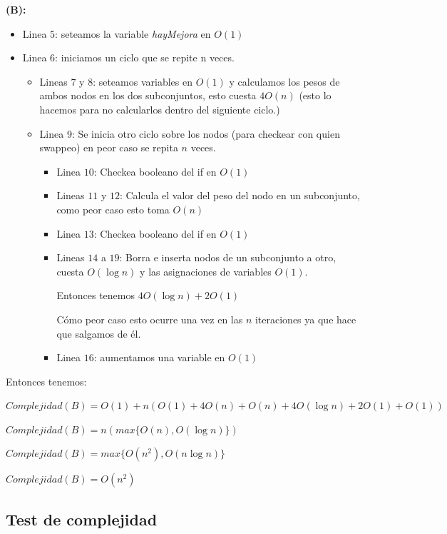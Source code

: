 \textbf{(B):}

\begin{itemize}
    \item Linea $5$: seteamos la variable \textit{hayMejora} en $O(1)$
    \item Linea $6$: iniciamos un ciclo que se repite n veces.
    \begin{itemize}
        \item Lineas $7$ y $8$: seteamos variables en $O(1)$ y calculamos los pesos de ambos nodos en los dos subconjuntos, esto cuesta $4O(n)$ (esto lo hacemos para no calcularlos dentro del siguiente ciclo.)
        \item Linea $9$: Se inicia otro ciclo sobre los nodos (para checkear con quien swappeo) en peor caso se repita $n$ veces.
        \begin{itemize}
            \item Linea $10$: Checkea booleano del if en $O(1)$
            \item Lineas $11$ y $12$: Calcula el valor del peso del nodo en un subconjunto, como peor caso esto toma $O(n)$
            \item Linea $13$: Checkea booleano del if en $O(1)$
            \item Lineas $14$ a $19$: Borra e inserta nodos de un subconjunto a otro, cuesta $O(\log n)$ y las asignaciones de variables $O(1)$. 

            Entonces tenemos $4O(\log n) + 2O(1)$

            Cómo peor caso esto ocurre una vez en las $n$ iteraciones ya que hace que salgamos de él.
            \item Linea $16$: aumentamos una variable en $O(1)$
        \end{itemize}
    \end{itemize}
\end{itemize}

Entonces tenemos:
\begin{center}
    $Complejidad(B) = O(1) + n(O(1)+4O(n)+O(n)+4O(\log n)+2O(1)+O(1))$

    $Complejidad(B) = n(max\{O(n),O(\log n)\})$

    $Complejidad(B) = max\{O(n^2),O(n\log n)\}$

    $Complejidad(B) = O(n^2)$
\end{center}

\subsection{Test de complejidad}


